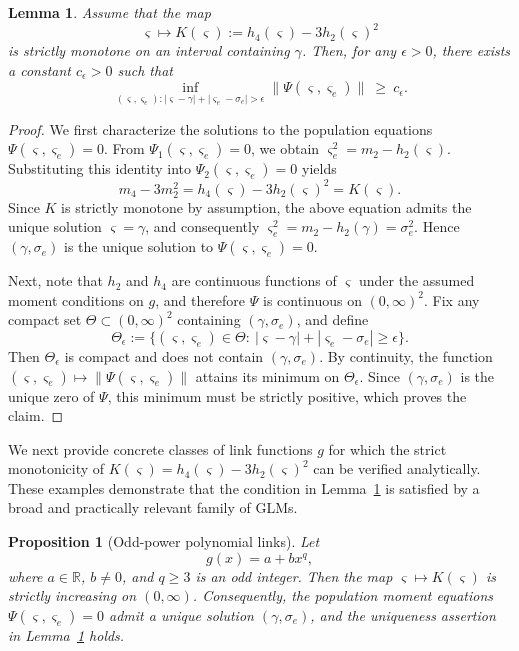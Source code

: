 \documentclass[12pt,reqno]{amsart}
\newtheorem{proposition}{Proposition}
\newtheorem{lemma}{Lemma}
\begin{document}
{\begin{lemma}
\label{lem:psi_separation}
Assume that the map
\[
\varsigma \mapsto K(\varsigma):=h_4(\varsigma)-3h_2(\varsigma)^2
\]
is strictly monotone on an interval containing $\gamma$.
Then, for any $\epsilon>0$, there exists a constant $c_\epsilon>0$ such that
\[
\inf_{(\varsigma,\varsigma_e): |\varsigma-\gamma|+|\varsigma_e-\sigma_e|>\epsilon}
\|\Psi(\varsigma,\varsigma_e)\| \ \ge\ c_\epsilon.
\]
\end{lemma}

\begin{proof}
We first characterize the solutions to the population equations $\Psi(\varsigma,\varsigma_e)=0$.
From $\Psi_1(\varsigma,\varsigma_e)=0$, we obtain $\varsigma_e^2 = m_2 - h_2(\varsigma).$
Substituting this identity into $\Psi_2(\varsigma,\varsigma_e)=0$ yields
\[
m_4 - 3m_2^2 = h_4(\varsigma)-3h_2(\varsigma)^2 = K(\varsigma).
\]
Since $K$ is strictly monotone by assumption, the above equation admits the unique solution
$\varsigma=\gamma$, and consequently $\varsigma_e^2 = m_2-h_2(\gamma)=\sigma_e^2$.
Hence $(\gamma,\sigma_e)$ is the unique solution to $\Psi(\varsigma,\varsigma_e)=0$.

Next, note that $h_2$ and $h_4$ are continuous functions of $\varsigma$ under the assumed moment
conditions on $g$, and therefore $\Psi$ is continuous on $(0,\infty)^2$.
Fix any compact set $\Theta\subset(0,\infty)^2$ containing $(\gamma,\sigma_e)$, and define
\[
\Theta_\epsilon
:=
\{(\varsigma,\varsigma_e)\in\Theta:\ |\varsigma-\gamma|+|\varsigma_e-\sigma_e|\ge\epsilon\}.
\]
Then $\Theta_\epsilon$ is compact and does not contain $(\gamma,\sigma_e)$.
By continuity, the function $(\varsigma,\varsigma_e)\mapsto\|\Psi(\varsigma,\varsigma_e)\|$
attains its minimum on $\Theta_\epsilon$.
Since $(\gamma,\sigma_e)$ is the unique zero of $\Psi$, this minimum must be strictly positive,
which proves the claim.
\end{proof}

We next provide concrete classes of link functions $g$ for which the strict monotonicity of $K(\varsigma)=h_4(\varsigma)-3h_2(\varsigma)^2$ can be verified analytically.
These examples demonstrate that the condition in Lemma~\ref{lem:psi_separation} is satisfied by a broad and practically relevant family of GLMs.

\begin{proposition}[Odd-power polynomial links]
\label{prop:odd_polynomial}
Let
\[
g(x)=a+b x^{q},
\]
where $a\in\mathbb R$, $b\neq 0$, and $q\ge 3$ is an odd integer.
Then the map $\varsigma\mapsto K(\varsigma)$ is strictly increasing on $(0,\infty)$.
Consequently, the population moment equations $\Psi(\varsigma,\varsigma_e)=0$ admit a unique solution $(\gamma,\sigma_e)$, and the uniqueness assertion in Lemma~\ref{lem:psi_separation} holds.
\end{proposition}

}
\end{document}
